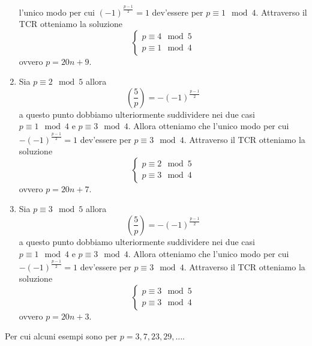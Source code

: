 \begin{esercizio}
\begin{enumerate}
			l'unico modo per cui  $(-1)^{\frac{p-1}{2}}= 1$ dev'essere per
			$p \equiv 1 \mod 4$. Attraverso il TCR otteniamo la soluzione
			\begin{equation*}
				\begin{cases}
					p \equiv 4 \mod 5 \\
					p \equiv 1 \mod 4
				\end{cases}
			\end{equation*}
			ovvero $p = 20n + 9$.
		\item Sia $p \equiv 2 \mod 5$ allora 
			\begin{equation*}
				\left(\frac{5}{p}\right) = -(-1)^{\frac{p-1}{2}}
			\end{equation*}
			a questo punto dobbiamo ulteriormente suddividere nei due casi 
			$p \equiv 1 \mod 4$ e $p \equiv 3 \mod 4$. Allora otteniamo che
			l'unico modo per cui  $-(-1)^{\frac{p-1}{2}}= 1$ dev'essere per
			$p \equiv 3 \mod 4$. Attraverso il TCR otteniamo la soluzione
			\begin{equation*}
				\begin{cases}
					p \equiv 2 \mod 5 \\
					p \equiv 3 \mod 4
				\end{cases}
			\end{equation*}
			ovvero $p = 20n + 7$.
		\item Sia $p \equiv 3 \mod 5$ allora 
			\begin{equation*}
				\left(\frac{5}{p}\right) = -(-1)^{\frac{p-1}{2}}
			\end{equation*}
			a questo punto dobbiamo ulteriormente suddividere nei due casi 
			$p \equiv 1 \mod 4$ e $p \equiv 3 \mod 4$. Allora otteniamo che
			l'unico modo per cui  $-(-1)^{\frac{p-1}{2}}= 1$ dev'essere per
			$p \equiv 3 \mod 4$. Attraverso il TCR otteniamo la soluzione
			\begin{equation*}
				\begin{cases}
					p \equiv 3 \mod 5 \\
					p \equiv 3 \mod 4
				\end{cases}
			\end{equation*}
			ovvero $p = 20n + 3$.
	\end{enumerate}
	Per cui alcuni esempi sono per $p = 3, 7, 23, 29, \dots$.
\end{esercizio}

\begin{esercizio}
	
\end{esercizio}

\begin{esercizio}
	
\end{esercizio}

\begin{esercizio}
	
\end{esercizio}